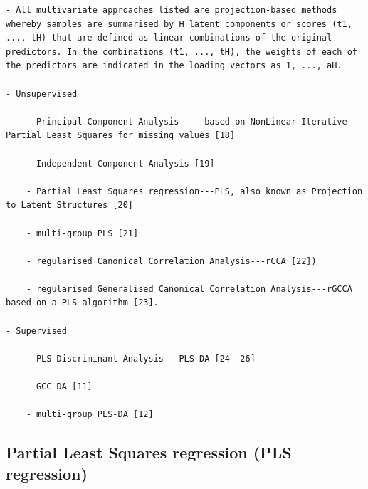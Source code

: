 \documentclass[
]{book}
\begin{document}
\begin{verbatim}
- All multivariate approaches listed are projection-based methods whereby samples are summarised by H latent components or scores (t1, ..., tH) that are defined as linear combinations of the original predictors. In the combinations (t1, ..., tH), the weights of each of the predictors are indicated in the loading vectors as 1, ..., aH.

- Unsupervised

    - Principal Component Analysis --- based on NonLinear Iterative Partial Least Squares for missing values [18]

    - Independent Component Analysis [19]

    - Partial Least Squares regression---PLS, also known as Projection to Latent Structures [20]

    - multi-group PLS [21]

    - regularised Canonical Correlation Analysis---rCCA [22])

    - regularised Generalised Canonical Correlation Analysis---rGCCA based on a PLS algorithm [23].

- Supervised

    - PLS-Discriminant Analysis---PLS-DA [24--26]

    - GCC-DA [11]

    - multi-group PLS-DA [12]
\end{verbatim}

\hypertarget{partial-least-squares-regression-pls-regression}{%
\subsection{Partial Least Squares regression (PLS regression)}\label{partial-least-squares-regression-pls-regression}}
\end{document}

